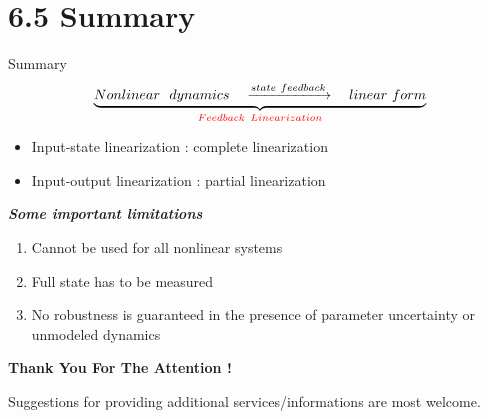 \documentclass{beamer}
\begin{document}
\section{6.5  Summary}

\begin{frame}{Summary}
    $$
    \underbrace{Nonlinear~~dynamics \quad \xrightarrow{state~feedback} \quad linear~form }_{\color{red}\large{Feedback ~Linearization}}
    $$
    \begin{itemize}
      \item {\color{red}Input-state linearization} : complete linearization
      \item {\color{red}Input-output linearization} : partial linearization
    \end{itemize}

    \textit{\textbf{Some important limitations}}
    \begin{enumerate}
      \item Cannot be used for all nonlinear systems
      \item Full state has to be measured
      \item No robustness is guaranteed in the presence of parameter uncertainty or unmodeled dynamics
    \end{enumerate}
\end{frame}

\begin{frame}[c]
       \centering
       \textbf{\Large Thank You For The Attention !}

    \vspace{+30pt}
    \centering
       {\footnotesize Suggestions for providing additional services/informations are most welcome.}
\end{frame}
\end{document}
